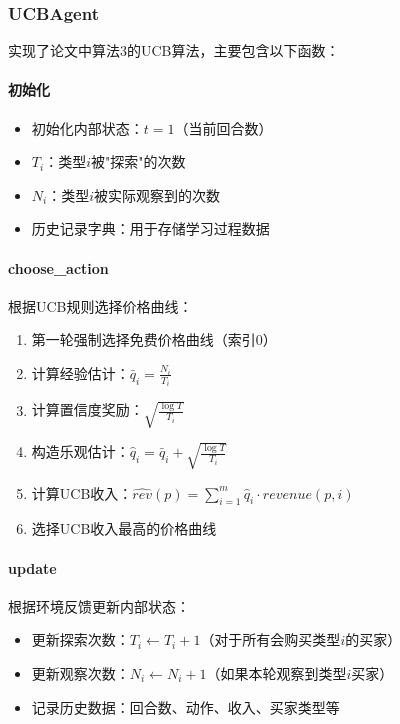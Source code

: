 \subsubsection{UCBAgent}

实现了论文中算法3的UCB算法，主要包含以下函数：

\paragraph{初始化}

\begin{itemize}
    \item 初始化内部状态：$t = 1$（当前回合数）
    \item $T_i$：类型$i$被"探索"的次数
    \item $N_i$：类型$i$被实际观察到的次数
    \item 历史记录字典：用于存储学习过程数据
\end{itemize}

\paragraph{choose\_action}

根据UCB规则选择价格曲线：

\begin{enumerate}
    \item 第一轮强制选择免费价格曲线（索引0）
    \item 计算经验估计：$\bar{q}_i = \frac{N_i}{T_i}$
    \item 计算置信度奖励：$\sqrt{\frac{\log T}{T_i}}$
    \item 构造乐观估计：$\hat{q}_i = \bar{q}_i + \sqrt{\frac{\log T}{T_i}}$
    \item 计算UCB收入：$\hat{rev}(p) = \sum_{i=1}^m \hat{q}_i \cdot revenue(p, i)$
    \item 选择UCB收入最高的价格曲线
\end{enumerate}

\paragraph{update}

根据环境反馈更新内部状态：

\begin{itemize}
    \item 更新探索次数：$T_i \leftarrow T_i + 1$（对于所有会购买类型$i$的买家）
    \item 更新观察次数：$N_i \leftarrow N_i + 1$（如果本轮观察到类型$i$买家）
    \item 记录历史数据：回合数、动作、收入、买家类型等
\end{itemize}

